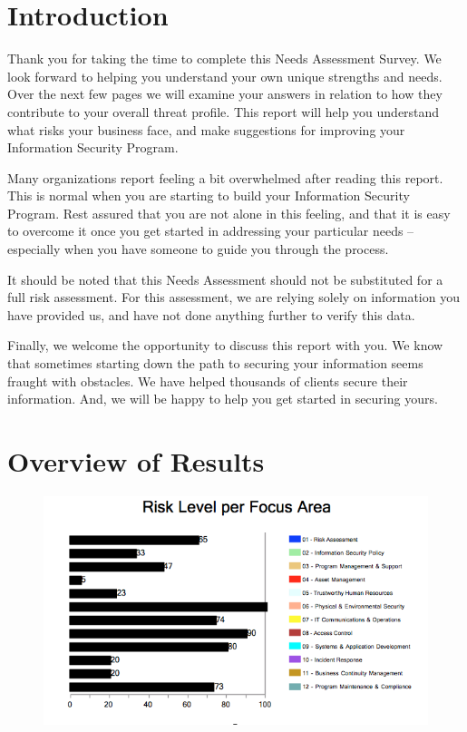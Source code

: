 \documentclass{needs}
\begin{document}
		\maketitle
		
		\tableofcontents

	
	
	\section{Introduction}
		Thank you for taking the time to complete this Needs Assessment Survey.  We look forward to helping you understand your own unique strengths and needs. Over the next few pages we will examine your answers in relation to how they contribute to your overall threat profile.  This report will help you understand what risks your business face, and make suggestions for improving your Information Security Program.
		
		Many organizations report feeling a bit overwhelmed after reading this report.  This is normal when you are starting to build your Information Security Program.  Rest assured that you are not alone in this feeling, and that it is easy to overcome it once you get started in addressing your particular needs – especially when you have someone to guide you through the process.
		
		It should be noted that this Needs Assessment should not be substituted for a full risk assessment.  For this assessment, we are relying solely on information you have provided us, and have not done anything further to verify this data.  
		
		Finally, we welcome the opportunity to discuss this report with you.  We know that sometimes starting down the path to securing your information seems fraught with obstacles.  We have helped thousands of clients secure their information.  And, we will be happy to help you get started in securing yours.
	
	\section{Overview of Results}
	
		\begin{figure}[h]
			\includegraphics[width = 1\textwidth]{chart.png}
		\end{figure}
		
\end{document}
